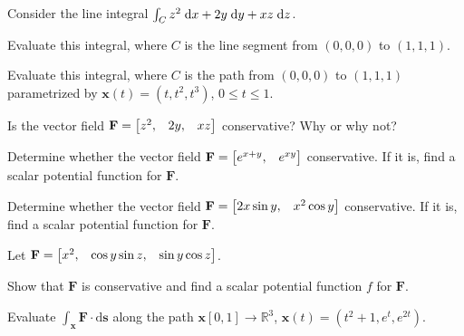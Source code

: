 \documentclass[boxes,printing,blanks]{gsypset}
\begin{document}
	\begin{problem}[6.3.1]
		Consider the line integral $\int_C z^2 \;\mathrm{d}x + 2y \;\mathrm{d}y + xz \;\mathrm{d}z$.
		\begin{subproblems}
			\subproblem 
				Evaluate this integral, where $C$ is the line segment from $(0, 0, 0)$ to $(1, 1, 1)$.
				\begin{solution}
					
				\end{solution}
			\subproblem 
				Evaluate this integral, where $C$ is the path from $(0, 0, 0)$ to $(1, 1, 1)$ 
				parametrized by $\mathbf{x}(t) = (t, t^2, t^3)$, $0 \leq t \leq 1$.
				\begin{solution}
					
				\end{solution}
			\subproblem 
				Is the vector field $\mathbf{F} = \begin{bmatrix}z^2, & 2y, & xz\end{bmatrix}$ conservative? Why or why not?
				\begin{solution}
					
				\end{solution}
		\end{subproblems}
	\end{problem}
	
	\begin{problem}[6.3.3]
		Determine whether the vector field $\mathbf{F} = \begin{bmatrix}e^{x+y}, & e^{xy}\end{bmatrix}$ conservative.
		If it is, find a scalar potential function for $\mathbf{F}$.
	\end{problem}
	\begin{solution}
		
	\end{solution}
	
	\begin{problem}[6.3.4]
		Determine whether the vector field $\mathbf{F} = \begin{bmatrix}2x \sin y, & x^2 \cos y\end{bmatrix}$ conservative.
		If it is, find a scalar potential function for $\mathbf{F}$.
	\end{problem}
	\begin{solution}
		
	\end{solution}
	
	\begin{problem}[6.3.25]
		Let $\mathbf{F} = \begin{bmatrix}x^2, & \cos y \sin z, & \sin y \cos z\end{bmatrix}$.
		\begin{subproblems}
			\subproblem 
				Show that $\mathbf{F}$ is conservative and 
				find a scalar potential function $f$ for $\mathbf{F}$.
				\begin{solution}
					
				\end{solution}
			\subproblem 
				Evaluate $\int_\mathbf{x}\mathbf{F} \cdot \mathrm{d}\mathbf{s}$
				along the path $\mathbf{x}[0,1] \to \mathbb{R}^3$,
				$\mathbf{x}(t) = (t^2 + 1, e^t, e^{2t})$.
				\begin{solution}
					
				\end{solution}
		\end{subproblems}
	\end{problem}
	
\end{document}
